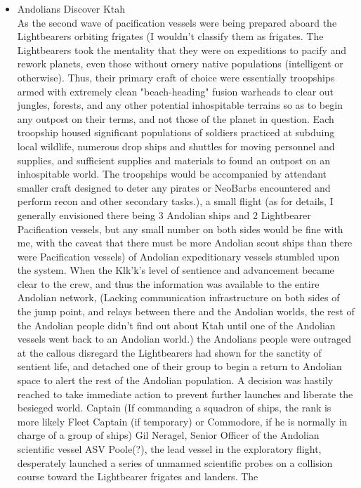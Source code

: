 \begin{itemize}
\item Andolians Discover Ktah \\

As the second wave of pacification vessels were being prepared aboard
the Lightbearers orbiting frigates (I wouldn't classify them as
frigates. The Lightbearers took the mentality that they were on
expeditions to pacify and rework planets, even those without ornery
native populations (intelligent or otherwise). Thus, their primary
craft of choice were essentially troopships armed with extremely clean 
"beach-heading" fusion warheads to clear out jungles, forests, and
any other potential inhospitable terrains so as to begin any outpost
on their terms, and not those of the planet in question. Each
troopship housed significant populations of soldiers practiced at
subduing local wildlife, numerous drop ships and shuttles for moving
personnel and supplies, and sufficient supplies and materials to found
an outpost on an inhospitable world. The troopships would be
accompanied by attendant smaller craft designed to deter any pirates
or NeoBarbs encountered and perform recon and other secondary tasks.),
a small flight (as for details, I generally envisioned there being 3
Andolian ships and 2 Lightbearer Pacification vessels, but any small
number on both sides would be fine with me, with the caveat that there
must be more Andolian scout ships than there were Pacification
vessels) of Andolian expeditionary vessels stumbled upon the system.
When the Klk'k's level of sentience and advancement became clear to
the crew, and thus the information was available to the entire
Andolian network, (Lacking communication infrastructure on both sides
of the jump point, and relays between there and the Andolian worlds,
the rest of the Andolian people didn't find out about Ktah until one
of the Andolian vessels went back to an Andolian world.) the Andolians
people were outraged at the callous disregard the Lightbearers had
shown for the sanctity of sentient life, and detached one of their
group to begin a return to Andolian space to alert the rest of the
Andolian population.  A decision was hastily reached to take immediate
action to prevent further launches and liberate the besieged world.
Captain (If commanding a squadron of ships, the rank is more likely
Fleet Captain (if temporary) or Commodore, if he is normally in charge
of a group of ships) Gil Neragel, Senior Officer of the Andolian
scientific vessel ASV Poole(?), the lead vessel in the exploratory
flight, desperately launched a series of unmanned scientific probes on
a collision course toward the Lightbearer frigates and landers.  The

\end{itemize}
